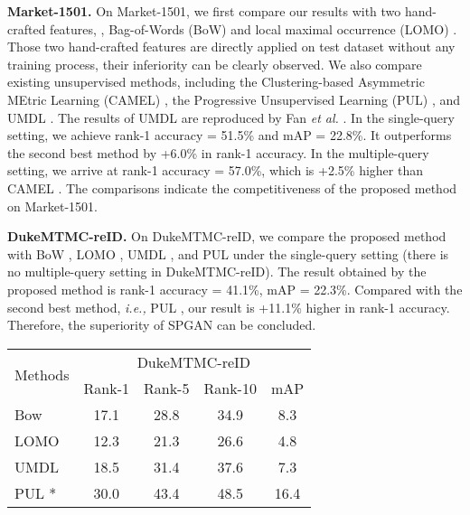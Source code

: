 \documentclass[10pt,twocolumn,letterpaper]{article}
\begin{document}
{\textbf{Market-1501.} On Market-1501, we first compare our results with two hand-crafted features, \ie, Bag-of-Words (BoW) \cite{DBLP:conf/iccv/ZhengSTWWT15} and local maximal occurrence (LOMO) \cite{DBLP:conf/cvpr/LiaoHZL15}. Those two hand-crafted features are directly applied on test dataset without any training process, their inferiority can be clearly observed.
We also compare existing unsupervised methods, including the Clustering-based Asymmetric MEtric Learning (CAMEL) \cite{CAMEL}, the Progressive Unsupervised Learning (PUL) \cite{fan17unsupervised}, and UMDL \cite{DBLP:conf/cvpr/PengXWPGHT16}. The results of UMDL are reproduced by Fan \emph{et al.} \cite{fan17unsupervised}. In the single-query setting, we achieve rank-1 accuracy = 51.5\% and mAP = 22.8\%. It outperforms the second best method \cite{fan17unsupervised} by +6.0\% in rank-1 accuracy. In the multiple-query setting, we arrive at rank-1 accuracy = 57.0\%, which is +2.5\% higher than CAMEL \cite{CAMEL}. The comparisons indicate the competitiveness of the proposed method on Market-1501.

\textbf{DukeMTMC-reID.} On DukeMTMC-reID, we compare the proposed method with BoW \cite{DBLP:conf/iccv/ZhengSTWWT15}, LOMO \cite{DBLP:conf/cvpr/LiaoHZL15}, UMDL \cite{DBLP:conf/cvpr/PengXWPGHT16}, and PUL \cite{fan17unsupervised} under the single-query setting (there is no multiple-query setting in DukeMTMC-reID). The result obtained by the proposed method is {rank-1 accuracy = 41.1\%, mAP = 22.3\%}. Compared with the second best method, \emph{i.e.,} PUL \cite{fan17unsupervised}, our result is +11.1\% higher in rank-1 accuracy. Therefore, the superiority of SPGAN can be concluded. 


\setlength{\tabcolsep}{6pt}
\begin{table}[t]
\setlength{\belowcaptionskip}{-0.2cm}
\begin{center}
\begin{tabular}{l|cccc}
\hline
\multicolumn{1}{l|}{\multirow{2}{*}{Methods}}&\multicolumn{4}{c}{DukeMTMC-reID}\\
\cline{2-5}
\multicolumn{1}{c|}{}&Rank-1&Rank-5&Rank-10&mAP\\
\hline
\hline
Bow \cite{DBLP:conf/iccv/ZhengSTWWT15}&17.1&28.8&34.9&8.3\\
LOMO \cite{DBLP:conf/cvpr/LiaoHZL15}&12.3&21.3&26.6&4.8\\
\hline
UMDL \cite{DBLP:conf/cvpr/PengXWPGHT16}&18.5&31.4&37.6&7.3\\
PUL \cite{fan17unsupervised}*&30.0&43.4&48.5&16.4\\


\end{tabular}
\end{center}
\end{table}}
\end{document}
